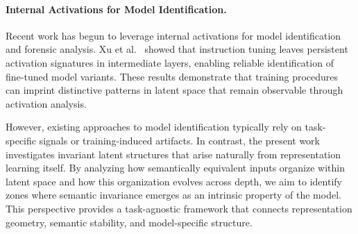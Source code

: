 \vspace{-1.0em}
\paragraph{Internal Activations for Model Identification.}
Recent work has begun to leverage internal activations for model identification and forensic analysis. Xu et al.~\cite{xu-etal-2024-instructional} showed that instruction tuning leaves persistent activation signatures in intermediate layers, enabling reliable identification of fine-tuned model variants. These results demonstrate that training procedures can imprint distinctive patterns in latent space that remain observable through activation analysis.

However, existing approaches to model identification typically rely on task-specific signals or training-induced artifacts. In contrast, the present work investigates invariant latent structures that arise naturally from representation learning itself. By analyzing how semantically equivalent inputs organize within latent space and how this organization evolves across depth, we aim to identify zones where semantic invariance emerges as an intrinsic property of the model. This perspective provides a task-agnostic framework that connects representation geometry, semantic stability, and model-specific structure.